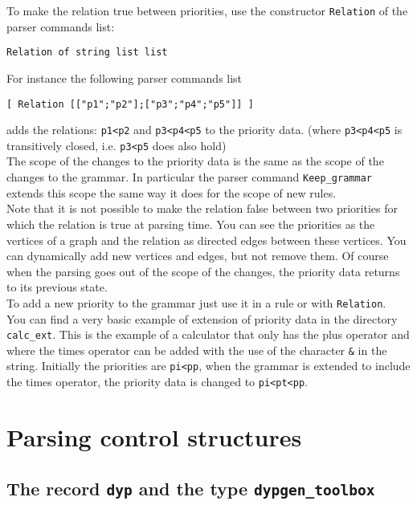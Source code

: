 \documentclass[12pt]{article}
\begin{document}
{To make the relation true between priorities, use the constructor \verb|Relation| of the parser commands list:
\begin{verbatim}
Relation of string list list
\end{verbatim}
For instance the following parser commands list
\begin{verbatim}
[ Relation [["p1";"p2"];["p3";"p4";"p5"]] ]
\end{verbatim}
adds the relations: \verb|p1<p2| and \verb|p3<p4<p5| to the priority data. (where \verb|p3<p4<p5| is transitively closed, i.e. \verb|p3<p5| does also hold)\\

The scope of the changes to the priority data is the same as the scope of the changes to the grammar. In particular the parser command \verb|Keep_grammar| extends this scope the same way it does for the scope of new rules.\\

Note that it is not possible to make the relation false between two priorities for which the relation is true at parsing time. You can see the priorities as the vertices of a graph and the relation as directed edges between these vertices. You can dynamically add new vertices and edges, but not remove them. Of course when the parsing goes out of the scope of the changes, the priority data returns to its previous state.\\

To add a new priority to the grammar just use it in a rule or with \verb|Relation|.\\

You can find a very basic example of extension of priority data in the directory \verb|calc_ext|. This is the example of a calculator that only has the plus operator and where the times operator can be added with the use of the character \verb|&| in the string. Initially the priorities are \verb|pi<pp|, when the grammar is extended to include the times operator, the priority data is changed to \verb|pi<pt<pp|.

\section{Parsing control structures}

\subsection{The record \texttt{dyp} and the type \texttt{dypgen\_toolbox}}\label{dyp}

}
\end{document}
